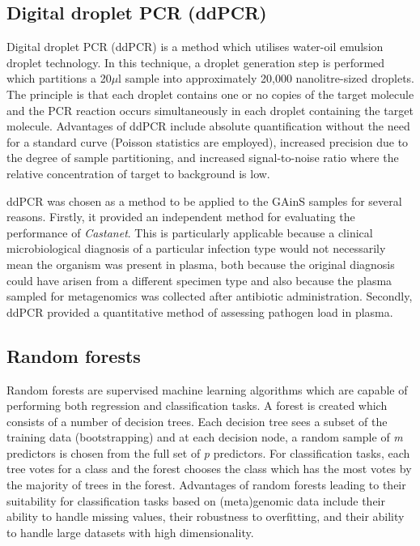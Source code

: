 \subsection{Digital droplet PCR (ddPCR)}
Digital droplet PCR (ddPCR) is a method which utilises water-oil emulsion droplet technology. In this technique, a droplet generation step is performed which partitions a 20$\mu$l sample into approximately 20,000 nanolitre-sized droplets. The principle is that each droplet contains one or no copies of the target molecule and the PCR reaction occurs simultaneously in each droplet containing the target molecule. Advantages of ddPCR include absolute quantification without the need for a standard curve (Poisson statistics are employed), increased precision due to the degree of sample partitioning, and increased signal-to-noise ratio where the relative concentration of target to background is low. 

ddPCR was chosen as a method to be applied to the GAinS samples for several reasons. Firstly, it provided an independent method for evaluating the performance of \textit{Castanet}. This is particularly applicable because a clinical microbiological diagnosis of a particular infection type would not necessarily mean the organism was present in plasma, both because the original diagnosis could have arisen from a different specimen type and also because the plasma sampled for metagenomics was collected after antibiotic administration. Secondly, ddPCR provided a quantitative method of assessing pathogen load in plasma.

\subsection{Random forests}
Random forests \parencite{Breiman2001} are supervised machine learning algorithms which are capable of performing both regression and classification tasks. A forest is created which consists of a number of decision trees. Each decision tree sees a subset of the training data (bootstrapping) and at each decision node, a random sample of \textit{m} predictors is chosen from the full set of \textit{p} predictors. For classification tasks, each tree votes for a class and the forest chooses the class which has the most votes by the majority of trees in the forest. Advantages of random forests leading to their suitability for classification tasks based on (meta)genomic data include their ability to handle missing values, their robustness to overfitting, and their ability to handle large datasets with high dimensionality. 

